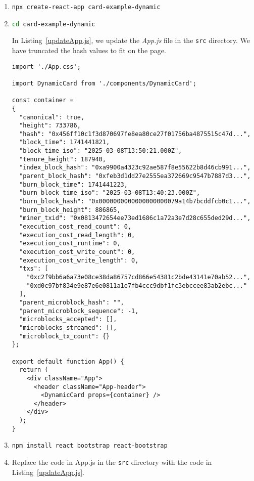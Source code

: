 \documentclass[12pt]{article}
\begin{document}
\begin{enumerate}

\item
\lstinline[language=bash]|npx create-react-app card-example-dynamic|

\item
\lstinline[language=bash]|cd card-example-dynamic|


In Listing~\ref{updateApp.js}, we update the {\em App.js} file in the \lstinline[language=bash]|src| directory.
We have truncated the hash values to fit on the page.

\begin{lstlisting}[label=updateApp.js,style=JSES6Base, caption={Update app.js in the {\em src} folder}]
import './App.css';

import DynamicCard from './components/DynamicCard';

const container = 
{
  "canonical": true,
  "height": 733786,
  "hash": "0x456ff10c1f3d870697fe8ea80ce27f01756ba4875515c47d...",
  "block_time": 1741441821,
  "block_time_iso": "2025-03-08T13:50:21.000Z",
  "tenure_height": 187940,
  "index_block_hash": "0xa9900a4323c92ae587f8e55622b8d46cb991...",
  "parent_block_hash": "0xfeb3d1dd27e2555ea372669c9547b7887d3...",
  "burn_block_time": 1741441223,
  "burn_block_time_iso": "2025-03-08T13:40:23.000Z",
  "burn_block_hash": "0x0000000000000000000079a14b7bcddfcb0c1...",
  "burn_block_height": 886865,
  "miner_txid": "0x0813472654ee73ed1686c1a72a3e7d28c655ded29d...",
  "execution_cost_read_count": 0,
  "execution_cost_read_length": 0,
  "execution_cost_runtime": 0,
  "execution_cost_write_count": 0,
  "execution_cost_write_length": 0,
  "txs": [
    "0xc2f9bb6a6a73e08ce38da86757cd866e54381c2bde43141e70ab52...",
    "0xd0c97bf834e9e87e6e0811a1e7fb4ccc9dbf1fc3ebccee83ab2ebc..."
  ],
  "parent_microblock_hash": "",
  "parent_microblock_sequence": -1,
  "microblocks_accepted": [],
  "microblocks_streamed": [],
  "microblock_tx_count": {}
};

export default function App() {
  return (
    <div className="App">
      <header className="App-header">  
        <DynamicCard props={container} /> 
      </header>
    </div>
  );
}
\end{lstlisting}

\item
\lstinline[language=bash]|npm install react bootstrap react-bootstrap|

\item Replace the code in App.js in the \lstinline[language=bash]|src| directory with the code
in Listing~\ref{updateApp.js}.

\end{enumerate}
\end{document}
